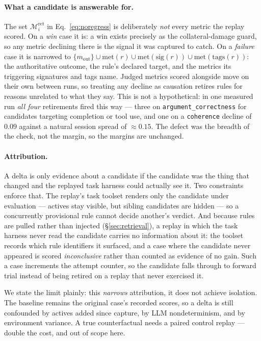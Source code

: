 \documentclass[11pt,letterpaper]{article}
\newcommand{\Mset}{\mathcal{M}}
\newcommand{\outcome}{m_{\mathrm{out}}}
\begin{document}
\paragraph{What a candidate is answerable for.}
The set $\Mset^{\mathrm{ret}}_i$ in Eq.~\eqref{eq:noregress} is deliberately \emph{not} every metric
the replay scored. On a \emph{win} case it is: a win exists precisely as the collateral-damage guard,
so any metric declining there is the signal it was captured to catch. On a \emph{failure} case it is
narrowed to $\{\outcome\}\cup\mathrm{met}(r)\cup\mathrm{met}(\mathrm{sig}(r))\cup\mathrm{met}(\mathrm{tags}(r))$:
the authoritative outcome, the rule's declared target, and the metrics its triggering signatures and
tags name. Judged metrics scored alongside move on their own between runs, so treating any decline as
causation retires rules for reasons unrelated to what they say. This is not a hypothetical: in one
measured run \emph{all four} retirements fired this way --- three on \texttt{argument\_correctness}
for candidates targeting completion or tool use, and one on a \texttt{coherence} decline of $0.09$
against a natural session spread of $\approx0.15$. The defect was the breadth of the check, not the
margin, so the margins are unchanged.

\paragraph{Attribution.}
A delta is only evidence about a candidate if the candidate was the thing that changed and the
replayed task harness could actually see it. Two constraints enforce that. The replay's task toolset renders
only the candidate under evaluation --- actives stay visible, but sibling candidates are hidden ---
so a concurrently provisional rule cannot decide another's verdict. And because rules are pulled
rather than injected (\S\ref{sec:retrieval}), a replay in which the task harness never read the candidate
carries no information about it: the toolset records which rule identifiers it surfaced, and a case
where the candidate never appeared is scored \emph{inconclusive} rather than counted as evidence of
no gain. Such a case increments the attempt counter, so the candidate falls through to forward trial
instead of being retired on a replay that never exercised it.

We state the limit plainly: this \emph{narrows} attribution, it does not achieve isolation. The
baseline remains the original case's recorded scores, so a delta is still confounded by actives added
since capture, by LLM nondeterminism, and by environment variance. A true counterfactual needs a
paired control replay --- double the cost, and out of scope here.
\end{document}
